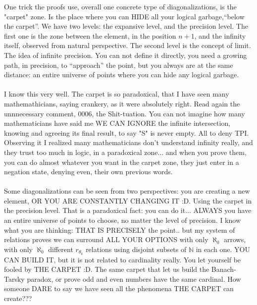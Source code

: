 		\noindent
		One trick the proofs use, overall one concrete type of diagonalizations, is the "carpet" zone. Is the place where you can HIDE all your logical garbage,``below the carpet''. We have two levels: the expansive level, and the precision level. The first one is the zone between the element, in the position $n+1$, and the infinity itself, observed from natural perspective. The second level is the concept of limit. The idea of infinite precision. You can not define it directly, you need a growing path, in precision, to ``approach'' the point, but you always are at the same distance: an entire universe of points where you can hide any logical garbage.
		\\\\
		
		\noindent
		I know this very well. The carpet is so paradoxical, that I have seen many mathemathicians, saying crankery, as it were absolutely right. Read again the unnnecessary comment, 0006, the Shit-tuation. You can not imagine how many mathematicians have said me WE CAN IGNORE the infinite intersection, knowing and agreeing its final result, to say "S" is never empty. All to deny TPI. Observing it I realized many mathematicians don't understand infinity really, and they trust too much in logic, in a paradoxical zone... and when you prove them, you can do almost whatever you want in the carpet zone, they just enter in a negation state, denying even, their own previous words.
		\\\\
		
		\noindent
		Some diagonalizations can be seen from two perspectives: you are creating a new element, OR YOU ARE CONSTANTLY CHANGING IT :D. Using the carpet in the precision level. That is a paradoxical fact: you can do it... ALWAYS you have an entire universe of points to choose, no matter the level of precision. I know what you are thinking: THAT IS PRECISELY the point.. but my system of relations proves we can surround ALL YOUR OPTIONS with only $\aleph_{0}$ arrows, with only $\aleph_{0}$ different $r_{\theta_{k}}$ relations using disjoint subsets of $\mathbb{N}$ in each one. YOU CAN BUILD IT, but it is not related to cardinality really. You let yourself be fooled by THE CARPET :D. The same carpet that let us build the Banach-Tarsky paradox, or prove odd and even numbers have the same cardinal. How someone DARE to say we have seen all the phenomena THE CARPET can create???
		\\\\
		
